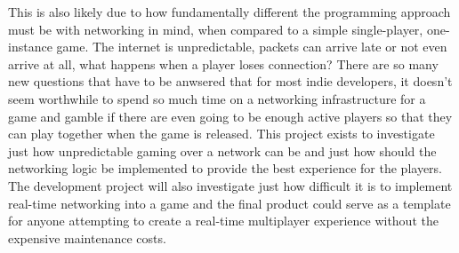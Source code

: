 This is also likely due to how fundamentally different the programming approach must be with networking in mind, when compared to a simple single-player, one-instance game. The internet is unpredictable, packets can arrive late or not even arrive at all, what happens when a player loses connection? There are so many new questions that have to be anwsered that for most indie developers, it doesn't seem worthwhile to spend so much time on a networking infrastructure for a game and gamble if there are even going to be enough active players so that they can play together when the game is released. This project exists to investigate just how unpredictable gaming over a network can be and just how should the networking logic be implemented to provide the best experience for the players. The development project will also investigate just how difficult it is to implement real-time networking into a game and the final product could serve as a template for anyone attempting to create a real-time multiplayer experience without the expensive maintenance costs.


\newpage
